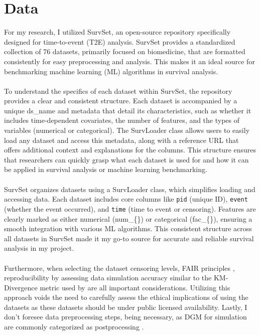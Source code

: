 \section{Data}
\noindent For my research, I utilized SurvSet, an open-source repository specifically designed for time-to-event (T2E) analysis. SurvSet provides a standardized collection of 76 datasets, primarily focused on biomedicine, that are formatted consistently for easy preprocessing and analysis. This makes it an ideal source for benchmarking machine learning (ML) algorithms in survival analysis.
\\\\
\noindent To understand the specifics of each dataset within SurvSet, the repository provides a clear and consistent structure. Each dataset is accompanied by a unique ds\_name and metadata that detail its characteristics, such as whether it includes time-dependent covariates, the number of features, and the types of variables (numerical or categorical). The SurvLoader class allows users to easily load any dataset and access this metadata, along with a reference URL that offers additional context and explanations for the columns. This structure ensures that researchers can quickly grasp what each dataset is used for and how it can be applied in survival analysis or machine learning benchmarking.
\\\\
\noindent SurvSet organizes datasets using a SurvLoader class, which simplifies loading and accessing data. Each dataset includes core columns like \texttt{pid} (unique ID), \texttt{event} (whether the event occurred), and \texttt{time} (time to event or censoring). Features are clearly marked as either numerical (num\_\{\}) or categorical (fac\_\{\}), ensuring a smooth integration with various ML algorithms. This consistent structure across all datasets in SurvSet made it my go-to source for accurate and reliable survival analysis in my project.
\\\\
\noindent Furthermore, when selecting the dataset censoring levels, FAIR principles \parencite{wilkinson_fair_2016}, reproducibility by assessing data simulation accuracy similar to the KM-Divergence metric used by \parencite{norcliffe_survivalgan_2023} are all important considerations. Utilizing this approach voids the need to carefully assess the ethical implications of using the datasets as these datasets should be under public licensed availability. Lastly, I don't foresee data preprocessing steps, being necessary, as DGM for simulation are commonly categorized as postprocessing \parencite{jin_imputation_2024}.



